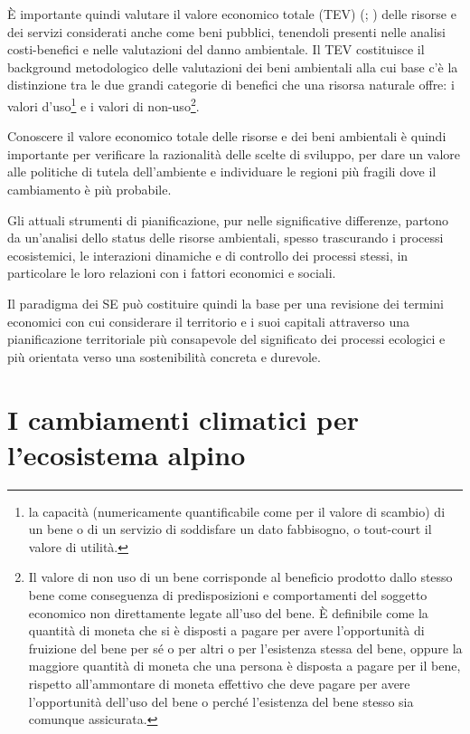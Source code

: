 \documentclass[14pt,a4paper]{article}
\begin{document}
	È importante quindi valutare il valore economico totale (TEV) (\cite{freeman2014measurement}; \cite{merlo2005valuing}) delle risorse e dei servizi considerati anche come beni pubblici, tenendoli presenti nelle analisi costi-benefici e nelle valutazioni del danno ambientale. Il TEV costituisce il background metodologico delle valutazioni dei beni ambientali alla cui base c'è la distinzione tra le due grandi categorie di benefici che una risorsa naturale offre: i valori d'uso\footnote{la capacità (numericamente quantificabile come per il valore di scambio) di un bene o di un servizio di soddisfare un dato fabbisogno, o tout-court il valore di utilità.} e i valori di non-uso\footnote{Il valore di non uso di un bene corrisponde al beneficio prodotto dallo stesso bene come conseguenza di predisposizioni e comportamenti del soggetto economico non direttamente legate all'uso del bene. È definibile come la quantità di moneta che si è disposti a pagare per avere l'opportunità di fruizione del bene per sé o per altri o per l'esistenza stessa del bene, oppure la maggiore quantità di moneta che una persona è disposta a pagare per il bene, rispetto all'ammontare  di moneta effettivo che deve pagare per avere l'opportunità dell'uso del bene o perché l'esistenza  del bene stesso sia comunque assicurata.}.  
	
	Conoscere il valore economico totale delle risorse e dei beni ambientali è quindi importante per verificare la razionalità delle scelte di sviluppo, per dare un valore alle politiche di tutela dell'ambiente e individuare le regioni più fragili dove il cambiamento è più probabile. 
	
	Gli attuali strumenti di pianificazione, pur nelle significative differenze, partono da un'analisi dello status delle risorse ambientali, spesso trascurando i processi ecosistemici, le interazioni dinamiche e di controllo dei processi stessi, in particolare le loro relazioni con i fattori economici e sociali. 
	
	Il paradigma dei SE può costituire quindi la base per una revisione dei termini economici con cui considerare il territorio e i suoi capitali attraverso una pianificazione territoriale più consapevole del significato dei processi ecologici e più orientata verso una sostenibilità concreta e durevole.
	
	
	\section{I cambiamenti climatici per l'ecosistema alpino}
	
\end{document}
